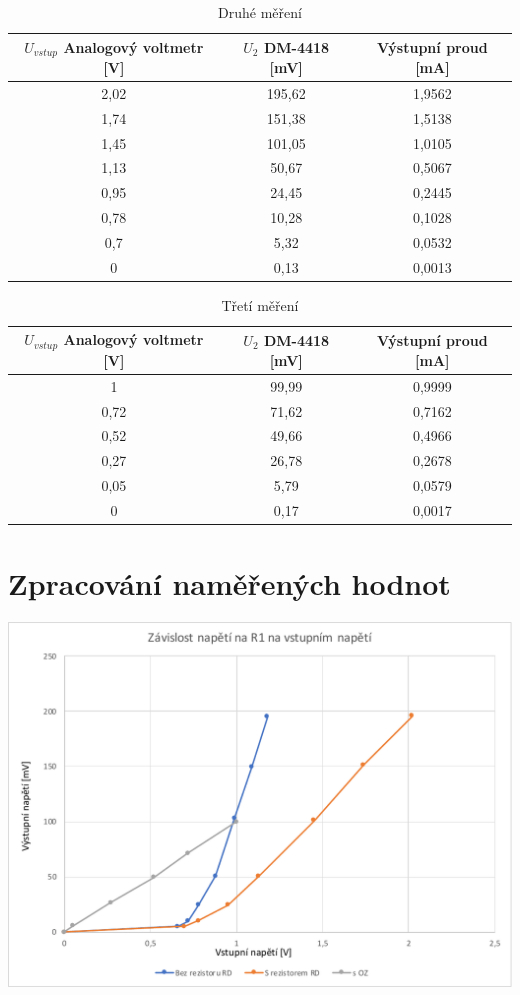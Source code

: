 \documentclass[a4paper,12pt]{article}   %
\begin{document}
\begin{table}[h!]
    \centering
    \begin{tabular}{|c|c|c|}
        \hline
        $U_{vstup}$ Analogový voltmetr [V] &$U_{2}$ DM-4418 [mV] &Výstupní proud [mA] \\\hline\hline
        2,02&195,62&1,9562\\\hline
        1,74&151,38&1,5138\\\hline
        1,45&101,05&1,0105\\\hline
        1,13&50,67&0,5067\\\hline
        0,95&24,45&0,2445\\\hline
        0,78&10,28&0,1028\\\hline
        0,7&5,32&0,0532\\\hline
        0&0,13&0,0013\\\hline
    \end{tabular}
    \caption{Druhé měření}
\end{table}

\begin{table}[h!]
    \centering
    \begin{tabular}{|c|c|c|}
        \hline
        $U_{vstup}$ Analogový voltmetr [V] &$U_{2}$ DM-4418 [mV] &Výstupní proud [mA] \\\hline\hline
        1&99,99&0,9999\\\hline
        0,72&71,62&0,7162\\\hline
        0,52&49,66&0,4966\\\hline
        0,27&26,78&0,2678\\\hline
        0,05&5,79&0,0579\\\hline
        0&0,17&0,0017\\\hline
    \end{tabular}
    \caption{Třetí měření}
\end{table}


\section{Zpracování naměřených hodnot}

\begin{graf}[h!]
    \centering
    \includegraphics[width=.7\textwidth]{napeti.pdf}
    \caption{Závislost napětí na R1 v~závislosti na vstupním napětí}
\end{graf}
\end{document}
